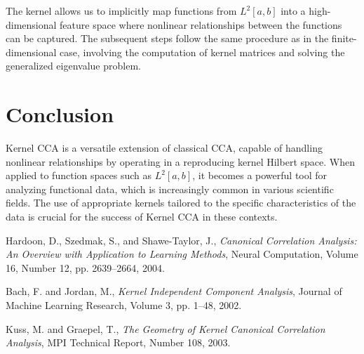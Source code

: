 \documentclass[12pt]{article}
\begin{document}
The kernel allows us to implicitly map functions from \( L^2[a,b] \) into a high-dimensional feature space where nonlinear relationships between the functions can be captured. The subsequent steps follow the same procedure as in the finite-dimensional case, involving the computation of kernel matrices and solving the generalized eigenvalue problem.

\section{Conclusion}

Kernel CCA is a versatile extension of classical CCA, capable of handling nonlinear relationships by operating in a reproducing kernel Hilbert space. When applied to function spaces such as \( L^2[a,b] \), it becomes a powerful tool for analyzing functional data, which is increasingly common in various scientific fields. The use of appropriate kernels tailored to the specific characteristics of the data is crucial for the success of Kernel CCA in these contexts.
\begin{thebibliography}{9}

  Hardoon, D., Szedmak, S., and Shawe-Taylor, J.,
  \emph{Canonical Correlation Analysis: An Overview with Application to Learning Methods}, 
  Neural Computation, 
  Volume 16, Number 12, pp. 2639--2664, 2004.

  Bach, F. and Jordan, M.,
  \emph{Kernel Independent Component Analysis}, 
  Journal of Machine Learning Research, 
  Volume 3, pp. 1--48, 2002.

  Kuss, M. and Graepel, T., 
  \emph{The Geometry of Kernel Canonical Correlation Analysis}, 
  MPI Technical Report, 
  Number 108, 2003.

\end{thebibliography}
\end{document}
